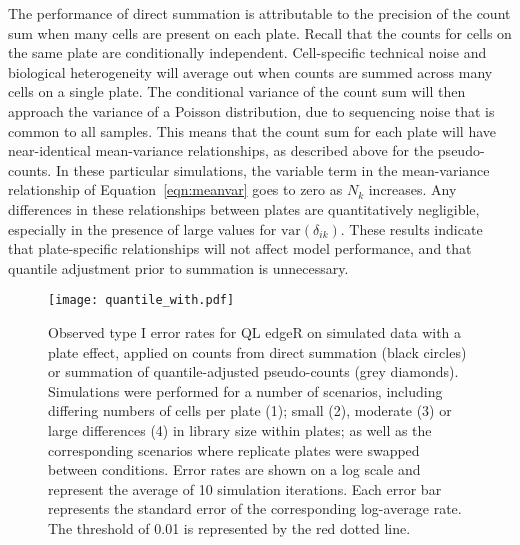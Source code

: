 \documentclass{article}
\begin{document}
The performance of direct summation is attributable to the precision of the count sum when many cells are present on each plate.
Recall that the counts for cells on the same plate are conditionally independent. 
Cell-specific technical noise and biological heterogeneity will average out when counts are summed across many cells on a single plate.
The conditional variance of the count sum will then approach the variance of a Poisson distribution, due to sequencing noise \cite{marioni2008rnaseq} that is common to all samples.
This means that the count sum for each plate will have near-identical mean-variance relationships, as described above for the pseudo-counts.
In these particular simulations, the variable term in the mean-variance relationship of Equation~\ref{eqn:meanvar} goes to zero as $N_k$ increases.
Any differences in these relationships between plates are quantitatively negligible, especially in the presence of large values for $\mbox{var}(\delta_{ik})$.
These results indicate that plate-specific relationships will not affect model performance, and that quantile adjustment prior to summation is unnecessary.

\begin{figure}[tbp]
\begin{center}
\texttt{[image: quantile\_with.pdf]}
\end{center}
\caption{
    Observed type I error rates for QL edgeR on simulated data with a plate effect, 
        applied on counts from direct summation (black circles) or summation of quantile-adjusted pseudo-counts (grey diamonds). 
    Simulations were performed for a number of scenarios, including differing numbers of cells per plate (1);
        small (2), moderate (3) or large differences (4) in library size within plates;
        as well as the corresponding scenarios where replicate plates were swapped between conditions.
    Error rates are shown on a log scale and represent the average of 10 simulation iterations.
    Each error bar represents the standard error of the corresponding log-average rate.
    The threshold of 0.01 is represented by the red dotted line.
}
\label{fig:complexplate}
\end{figure}

\end{document}
